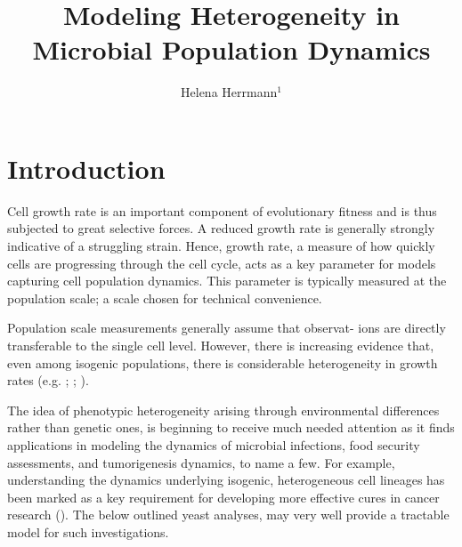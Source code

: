 \documentclass{bioinfo}
\begin{document}

\title[Project Proposal]{\Large{Modeling Heterogeneity in Microbial Population Dynamics}}
\author[Helena Herrmann]{Helena Herrmann$^{1}$}
\address{$^{1}$School of Computing Science, Newcastle University,UK}

\vspace{-3em}
\maketitle

\section{Introduction}

Cell growth rate is an important component of evolutionary fitness and is thus subjected to great selective forces. A reduced growth rate is generally strongly indicative of a struggling strain. Hence, growth rate, a measure of how quickly cells are progressing through the cell cycle, acts as a key parameter for models capturing cell population dynamics. This parameter is typically measured at the population scale; a scale chosen for technical convenience. 

Population scale measurements generally assume that observat- ions are directly transferable to the single cell level. However, there is increasing evidence that, even among isogenic populations, there is considerable heterogeneity in growth rates (e.g. \citealp{Pin06}; \citealp{Schmidt12}; \citealp{Levy12}). 

The idea of phenotypic heterogeneity arising through environmental differences rather than genetic ones, is beginning to receive much needed attention as it finds applications in modeling the dynamics of microbial infections, food security assessments, and tumorigenesis dynamics, to name a few.  For example, understanding the dynamics underlying isogenic, heterogeneous cell lineages has been marked as a key requirement for developing more effective cures in cancer research (\citealp{Tabassum15}). The below outlined yeast analyses, may very well provide a tractable model for such investigations. 
\end{document}
